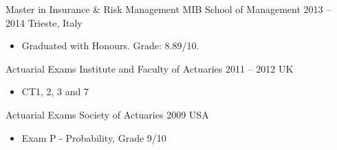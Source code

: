 \documentclass[a4paper,]{fortysecondscv}
\begin{document}

\begin{cvtable}%
    \vspace{\topsep}
    \cvitemoneblock
    {Master in Insurance \& Risk Management}
    {MIB School of Management}
    {2013 -- 2014}
    {Trieste, Italy}
    {
        \begin{itemize}[nosep, leftmargin=12pt, label={-}] %
            \item Graduated with Honours. Grade: 8.89/10.
        \end{itemize}
    }
    \vspace{\topsep}
    \cvitemoneblock
    {Actuarial Exams}
    {Institute and Faculty of Actuaries}
    {2011 -- 2012}
    {UK}
    {
        \begin{itemize}[nosep, leftmargin=12pt, label={-}]
            \item CT1, 2, 3 and 7
        \end{itemize}
    }


    \vspace{\topsep}
    \cvitemoneblock
    {Actuarial Exams}
    {Society of Actuaries}
    {2009}
    {USA}
    {
        \vspace{-\topsep}
        \begin{itemize}[nosep, leftmargin=12pt, label={-}]
            \item Exam P - Probability, Grade 9/10
        \end{itemize}
    }
\end{cvtable}
\end{document}
